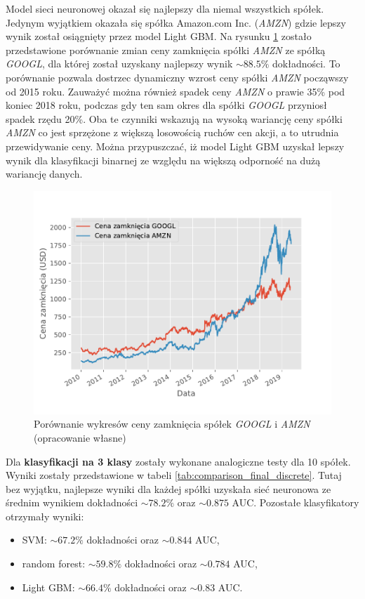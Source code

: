 \documentclass[a4paper, twoside, 11pt, openright]{article}
\begin{document}
Model sieci neuronowej okazał się najlepszy dla niemal wszystkich spółek.  Jedynym wyjątkiem okazała się spółka Amazon.com Inc. (\textit{AMZN}) gdzie lepszy wynik został osiągnięty przez model Light GBM. Na rysunku \ref{img:amzn_googl_adjusted_comparison} zostało przedstawione porównanie zmian ceny zamknięcia spółki \textit{AMZN} ze spółką \textit{GOOGL}, dla której został uzyskany najlepszy wynik $\sim 88.5\%$ dokładności. To porównanie pozwala dostrzec dynamiczny wzrost ceny spółki \textit{AMZN} począwszy od 2015 roku. Zauważyć można również spadek ceny \textit{AMZN} o prawie 35\% pod koniec 2018 roku, podczas gdy ten sam okres dla spółki \textit{GOOGL} przyniosł spadek rzędu 20\%. Oba te czynniki wskazują na wysoką wariancję ceny spółki \textit{AMZN} co jest sprzężone z większą losowością ruchów cen akcji, a to utrudnia przewidywanie ceny. Można przypuszczać, iż model Light GBM uzyskał lepszy wynik dla klasyfikacji binarnej ze względu na większą odporność na dużą wariancję danych. 


\begin{figure}[H]
\centering \includegraphics[scale=1]{img/AMZN_GOOGL_close_comparison.pdf}
\caption{Porównanie wykresów ceny zamknięcia spółek \textit{GOOGL} i \textit{AMZN} (opracowanie własne)}
\label{img:amzn_googl_adjusted_comparison}
\end{figure}



\bigskip

Dla \textbf{klasyfikacji na 3 klasy} zostały wykonane analogiczne testy dla 10 spółek. Wyniki zostały przedstawione w tabeli \ref{tab:comparison_final_discrete}. Tutaj bez wyjątku, najlepsze wyniki dla każdej spółki uzyskała sieć neuronowa ze średnim wynikiem dokładności $\sim 78.2\%$ oraz $\sim 0.875$ AUC. Pozostałe klasyfikatory otrzymały wyniki: 
\begin{itemize}
\item SVM: $\sim 67.2\%$ dokładności oraz $\sim 0.844$ AUC,
\item random forest: $\sim 59.8\%$ dokładności oraz $\sim 0.784$ AUC,
\item Light GBM: $\sim 66.4\%$ dokładności oraz $\sim 0.83$ AUC.
\end{itemize}  
\end{document}
